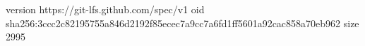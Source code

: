 version https://git-lfs.github.com/spec/v1
oid sha256:3ccc2c82195755a846d2192f85ecec7a9cc7a6fd1ff5601a92cac858a70eb962
size 2995
